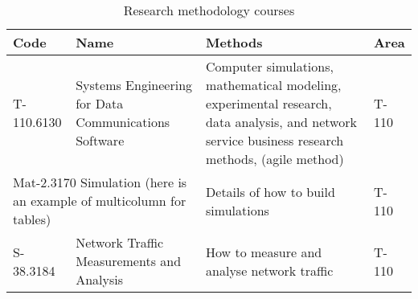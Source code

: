 \begin{table}
\begin{tabular}{|p{2cm}|p{3.8cm}|p{4.5cm}|p{1.1cm}|} 
\hline %
\textbf{Code} & \textbf{Name} & \textbf{Methods} & \textbf{Area} \\ 
\hline 
T-110.6130 & Systems Engineering for Data Communications
    Software & \raggedright Computer simulations, mathematical modeling,
  experimental research, data analysis, and network service business
  research methods, (agile method) & T-110 \\ 
\hline
\multicolumn{2}{|p{6.25cm}|}{Mat-2.3170 Simulation (here is an example of
 multicolumn for tables)}& Details of how to build simulations & T-110 \\
\hline
S-38.3184 & Network Traffic Measurements and Analysis 
& \raggedright How to measure and analyse network
  traffic & T-110 \\ \hline
\end{tabular} %
\caption{Research methodology courses}
\label{table:courses}
\end{table} %

